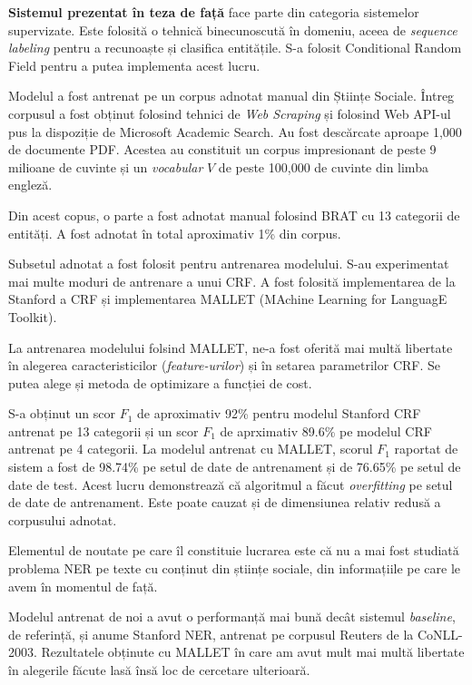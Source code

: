 \textbf{Sistemul prezentat în teza de față} face parte din categoria sistemelor supervizate. Este folosită o tehnică binecunoscută în domeniu, aceea de \textit{sequence labeling} pentru a recunoaște și clasifica entitățile. S-a folosit Conditional Random Field pentru a putea implementa acest lucru. 

Modelul a fost antrenat pe un corpus adnotat manual din Științe Sociale. Întreg corpusul a fost obținut folosind tehnici de \textit{Web Scraping} și folosind Web API-ul pus la dispoziție de Microsoft Academic Search. Au fost descărcate aproape 1,000 de documente PDF. Acestea au constituit un corpus impresionant de peste 9 milioane de cuvinte și un \textit{vocabular} $V$ de peste 100,000 de cuvinte din limba engleză.

Din acest copus, o parte a fost adnotat manual folosind BRAT cu 13 categorii de entități. A fost adnotat în total aproximativ 1\% din corpus.

Subsetul adnotat a fost folosit pentru antrenarea modelului. S-au experimentat mai multe moduri de antrenare a unui CRF. A fost folosită implementarea de la Stanford a CRF și implementarea MALLET (MAchine Learning for LanguagE Toolkit). 

La antrenarea modelului folsind MALLET, ne-a fost oferită mai multă libertate în alegerea caracteristicilor (\textit{feature-urilor}) și în setarea parametrilor CRF. Se putea alege și metoda de optimizare a funcției de cost.

S-a obținut un scor $F_1$ de aproximativ 92\% pentru modelul Stanford CRF antrenat pe 13 categorii și un scor $F_1$ de aprximativ 89.6\% pe modelul CRF antrenat pe 4 categorii. La modelul antrenat cu MALLET, scorul $F_1$ raportat de sistem a fost de 98.74\% pe setul de date de antrenament și de 76.65\% pe setul de date de test. Acest lucru demonstrează că algoritmul a făcut \textit{overfitting} pe setul de date de antrenament. Este poate cauzat și de dimensiunea relativ redusă a corpusului adnotat.

Elementul de noutate pe care îl constituie lucrarea este că nu a mai fost studiată problema NER pe texte cu conținut din științe sociale, din informațiile pe care le avem în momentul de față.

Modelul antrenat de noi a avut o performanță mai bună decât sistemul \textit{baseline}, de referință, și anume Stanford NER, antrenat pe corpusul Reuters de la CoNLL-2003. Rezultatele obținute cu MALLET în care am avut mult mai multă libertate în alegerile făcute lasă însă loc de cercetare ulterioară.

